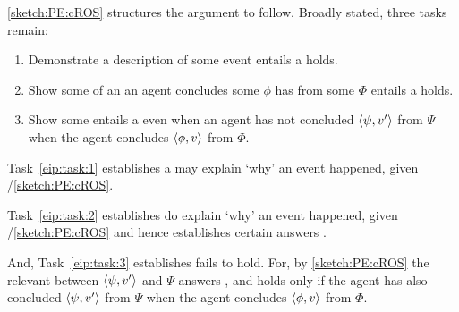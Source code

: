 \begin{note}
  \autoref{sketch:PE:cROS} structures the argument to follow.
  Broadly stated, three tasks remain:

  \begin{enumerate}[label=\arabic*., ref=\arabic*]
  \item
    \label{eip:task:1}
    Demonstrate a description of some event entails a \fingfr{} holds.
  \item
    \label{eip:task:2}
    Show some \se{} of an  an agent concludes some  \(\phi\) has  from some  \(\Phi\) entails a \fingfr{} holds.
  \item
    \label{eip:task:3}
    Show some \se{} entails a  even when an agent has not concluded \(\langle\psi, v'\rangle\) from \(\Psi\) when the agent concludes \(\langle\phi, v\rangle\) from \(\Phi\).
  \end{enumerate}

  Task~\ref{eip:task:1} establishes a  may explain `why' an event happened, given \progExII{}/\autoref{sketch:PE:cROS}.

  Task~\ref{eip:task:2} establishes  do explain `why' an event happened, given \progExII{}/\autoref{sketch:PE:cROS} and hence establishes certain answers \qWhy{}.

  And, Task~\ref{eip:task:3} establishes \issueInclusion{} fails to hold.
  For, by \autoref{sketch:PE:cROS} the relevant \fingfr{} between \(\langle\psi, v'\rangle\) and \(\Psi\) answers \qWhy{}, and \issueInclusion{} holds only if the agent has also concluded \(\langle\psi, v'\rangle\) from \(\Psi\) when the agent concludes \(\langle\phi, v\rangle\) from \(\Phi\).
\end{note}


